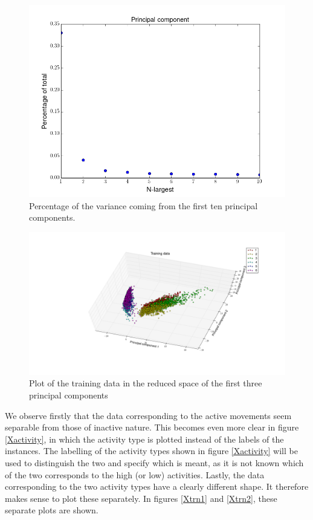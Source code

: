\documentclass [a4paper] {report}
\begin{document}
	\begin{figure}[H]
		\begin{center}
			\includegraphics[scale=0.35]{Images/singvals.png}
		\end{center}
		\caption{Percentage of the variance coming from the first ten principal components.}
		\label{singvals}
	\end{figure}
	
	\begin{figure}[H]
		\begin{center}
			\includegraphics[scale=0.35]{Images/Xtrn.png}
		\end{center}
		\caption{Plot of the training data in the reduced space of the first three principal components}
		\label{Xtrn}
	\end{figure}
	
	\noindent
	We observe firstly that the data corresponding to the active movements seem separable from those of inactive nature. This becomes even more clear in figure \ref{Xactivity}, in which the activity type is plotted instead of the labels of the instances. The labelling of the activity types shown in figure \ref{Xactivity} will be used to distinguish the two and specify which is meant, as it is not known which of the two corresponds to the high (or low) activities. Lastly, the data corresponding to the two activity types have a clearly different shape. It therefore makes sense to plot these separately. In figures \ref{Xtrn1} and \ref{Xtrn2}, these separate plots are shown.
	
\end{document}
